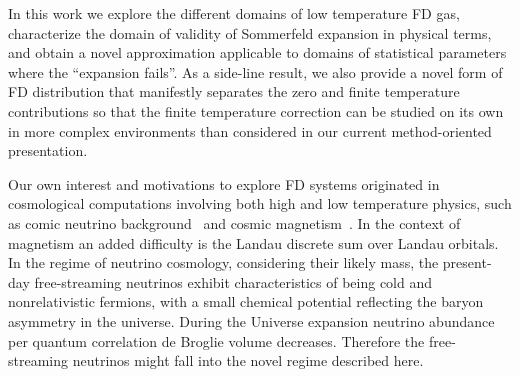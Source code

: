\documentclass[sn-mathphys,Numbered]{sn-jnl}
\begin{document}
In this work we explore the different domains of low temperature FD gas, characterize the domain of validity of Sommerfeld expansion in physical terms, and obtain a novel approximation applicable to domains of statistical parameters where the ``expansion fails''.  As a side-line result, we also provide a novel form of FD distribution that manifestly separates the zero and finite temperature contributions so that the finite temperature correction can be studied on its own in more complex environments than considered in our current method-oriented presentation.  
 
Our own  interest and motivations to explore FD systems originated in  cosmological computations involving both high and low temperature physics, such as comic neutrino background~\cite{Birrell:2013gpa,Birrell:2012gg} and cosmic magnetism~\cite{Steinmetz:2023nsc}. In the context of magnetism an added difficulty is the Landau discrete sum over Landau orbitals.  In the regime of neutrino cosmology, considering their likely mass,  the present-day free-streaming neutrinos  exhibit characteristics of being cold and nonrelativistic fermions, with a small chemical potential reflecting the baryon asymmetry in the universe. During the Universe expansion neutrino abundance per quantum correlation de Broglie volume decreases. Therefore the free-streaming neutrinos might fall into the novel regime described here.

\end{document}
